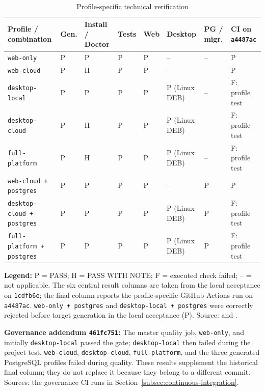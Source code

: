 \begin{table}[H]
  \centering
  \scriptsize
  \renewcommand{\arraystretch}{1.1}
  \caption{Profile-specific technical verification}
  \label{tab:verification-matrix}
  \begin{tabularx}{\textwidth}{@{}>{\raggedright\arraybackslash}p{}>{\centering\arraybackslash}p{}>{\centering\arraybackslash}p{}>{\centering\arraybackslash}p{}>{\centering\arraybackslash}p{}>{\centering\arraybackslash}p{}>{\centering\arraybackslash}p{}>{\raggedright\arraybackslash}X@{}}
    \toprule
    \textbf{Profile / combination} & \textbf{Gen.} & \textbf{Install / Doctor} & \textbf{Tests} & \textbf{Web} & \textbf{Desktop} & \textbf{PG / migr.} & \textbf{CI on \texttt{a4487ac}} \\
    \midrule
    \texttt{web-only} & P & P & P & P & -- & -- & P \\
    \texttt{web-cloud} & P & H & P & P & -- & -- & P \\
    \texttt{desktop-local} & P & P & P & P & P (Linux DEB) & -- & F: profile test \\
    \texttt{desktop-cloud} & P & H & P & P & P (Linux DEB) & -- & F: profile test \\
    \texttt{full-platform} & P & H & P & P & P (Linux DEB) & -- & F: profile test \\
    \midrule
    \texttt{web-cloud + postgres} & P & P & P & P & -- & P & P \\
    \texttt{desktop-cloud + postgres} & P & P & P & P & P (Linux DEB) & P & F: profile test \\
    \texttt{full-platform + postgres} & P & P & P & P & P (Linux DEB) & P & F: profile test \\
    \bottomrule
  \end{tabularx}
  \smallskip
  \begin{minipage}{\textwidth}
    \scriptsize
    \textbf{Legend:} P = PASS; H = PASS WITH NOTE; F = executed check failed;
    -- = not applicable. The six central result columns are taken from the local acceptance
    on \texttt{1cdfb6e}; the final column reports the profile-specific GitHub Actions run on
    \texttt{a4487ac}. \texttt{web-only + postgres} and
    \texttt{desktop-local + postgres} were correctly rejected before target generation in the
    local acceptance (P). Source: \textcite{kleiveist2026acceptance} and
    \textcite{kleiveist2026ci-profiles-run,kleiveist2026ci-postgres-run}.

    \textbf{Governance addendum \texttt{461fc751}:} The master quality job,
    \texttt{web-only}, and initially \texttt{desktop-local} passed the gate;
    \texttt{desktop-local} then failed during the project test.
    \texttt{web-cloud}, \texttt{desktop-cloud}, \texttt{full-platform}, and
    the three generated PostgreSQL profiles failed during quality. These
    results supplement the historical final column; they do not replace it
    because they belong to a different commit. Sources: the governance CI runs
    in Section~\ref{subsec:continuous-integration}.
  \end{minipage}
\end{table}
